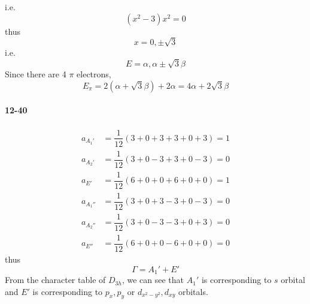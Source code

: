 \documentclass[a4paper]{article}
\newcommand{\ex}[1]{\paragraph{12-#1}}
\numberwithin{equation}{section}
\begin{document}
i.e.
\begin{equation}\label{key}
(x^2 - 3)x^2 = 0
\end{equation}
thus
\begin{equation}\label{key}
x = 0, \pm \sqrt{3}
\end{equation}
i.e.
\begin{equation}\label{key}
E = \alpha, \alpha\pm\sqrt{3}\beta
\end{equation}
Since there are 4 $ \pi $ electrons, 
\begin{equation}\label{key}
E_\pi = 2(\alpha+\sqrt{3}\beta) + 2\alpha  = 4\alpha + 2\sqrt{3}\beta
\end{equation}

\ex{40}
\begin{align}
a_{A_1'} &= \dfrac{1}{12}(3 + 0 + 3 +3 + 0 + 3) = 1\\
a_{A_2'} &= \dfrac{1}{12}(3 + 0 - 3 +3 + 0 - 3) = 0\\
a_{E'} &= \dfrac{1}{12}(6 + 0 + 0 + 6 + 0 + 0) = 1\\
a_{A_1''} &= \dfrac{1}{12}(3 + 0 + 3 -3 + 0 - 3) = 0\\
a_{A_2''} &= \dfrac{1}{12}(3 + 0 - 3 -3 + 0 + 3) = 0\\
a_{E''} &= \dfrac{1}{12}(6 + 0 + 0 -6 + 0 + 0) = 0
\end{align}
thus
\begin{equation}\label{key}
\Gamma = A_1' + E' 
\end{equation}
From the character table of $ D_{3h} $, we can see that $ A_1' $ is corresponding to $ s $ orbital and $ E' $ is corresponding to $ p_x,p_y $ or $ d_{x^2-y^2},d_{xy} $ orbitals.
\end{document}
